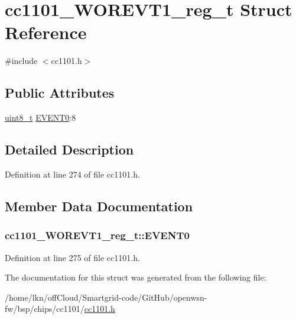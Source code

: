\hypertarget{structcc1101___w_o_r_e_v_t1__reg__t}{}\section{cc1101\+\_\+\+W\+O\+R\+E\+V\+T1\+\_\+reg\+\_\+t Struct Reference}
\label{structcc1101___w_o_r_e_v_t1__reg__t}


{\ttfamily \#include $<$cc1101.\+h$>$}

\subsection*{Public Attributes}
\begin{DoxyCompactItemize}
\item 
\hyperlink{_p_e___types_8h_aba7bc1797add20fe3efdf37ced1182c5}{uint8\+\_\+t} \hyperlink{structcc1101___w_o_r_e_v_t1__reg__t_aaa79a52fd9e8d1bf0f4fd96cf72278ee}{E\+V\+E\+N\+T0}\+:8
\end{DoxyCompactItemize}


\subsection{Detailed Description}


Definition at line 274 of file cc1101.\+h.



\subsection{Member Data Documentation}
\subsubsection[{\texorpdfstring{E\+V\+E\+N\+T0}{EVENT0}}]{ cc1101\+\_\+\+W\+O\+R\+E\+V\+T1\+\_\+reg\+\_\+t\+::\+E\+V\+E\+N\+T0}\hypertarget{structcc1101___w_o_r_e_v_t1__reg__t_aaa79a52fd9e8d1bf0f4fd96cf72278ee}{}\label{structcc1101___w_o_r_e_v_t1__reg__t_aaa79a52fd9e8d1bf0f4fd96cf72278ee}


Definition at line 275 of file cc1101.\+h.



The documentation for this struct was generated from the following file\+:\begin{DoxyCompactItemize}
\item 
/home/lkn/off\+Cloud/\+Smartgrid-\/code/\+Git\+Hub/openwsn-\/fw/bsp/chips/cc1101/\hyperlink{cc1101_8h}{cc1101.\+h}\end{DoxyCompactItemize}

